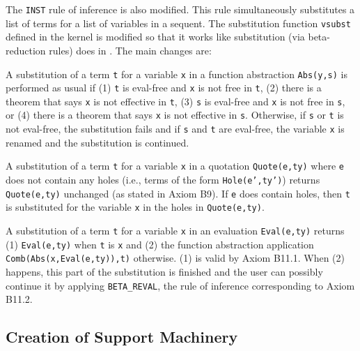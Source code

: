 \documentclass[fleqn]{llncs}
\begin{document}
The \texttt{INST} rule of inference is also modified.  This rule
simultaneously substitutes a list of terms for a list of variables in
a sequent.  The substitution function \texttt{vsubst} defined in the
{\HL} kernel is modified so that it works like substitution (via
beta-reduction  rules) does in {\churchqe}.  The main changes are:

\be

  \item A substitution of a term \texttt{t} for a variable \texttt{x}
    in a function abstraction \texttt{Abs(y,s)} is performed as usual
    if (1) \texttt{t} is eval-free and \texttt{x} is not free in
    \texttt{t}, (2) there is a theorem that says \texttt{x} is not
    effective in \texttt{t}, (3) \texttt{s} is eval-free and
    \texttt{x} is not free in \texttt{s}, or (4) there is a theorem
    that says \texttt{x} is not effective in \texttt{s}.  Otherwise,
    if \texttt{s} or \texttt{t} is not eval-free, the substitution
    fails and if \texttt{s} and \texttt{t} are eval-free, the variable
    \texttt{x} is renamed and the substitution is continued.

  \item A substitution of a term \texttt{t} for a variable \texttt{x}
    in a quotation \texttt{Quote(e,ty)} where \texttt{e} does not
    contain any holes (i.e., terms of the form \texttt{Hole(e',ty')})
    returns \texttt{Quote(e,ty)} unchanged (as stated in Axiom B9).
    If \texttt{e} does contain holes, then \texttt{t} is substituted
    for the variable \texttt{x} in the holes in \texttt{Quote(e,ty)}.

  \item A substitution of a term \texttt{t} for a variable \texttt{x}
    in an evaluation \texttt{Eval(e,ty)} returns (1)
    \texttt{Eval(e,ty)} when \texttt{t} is \texttt{x} and (2) the
    function abstraction application
    \texttt{Comb(Abs(x,Eval(e,ty)),t)} otherwise.  (1) is valid by
    Axiom B11.1.  When (2) happens, this part of the substitution is
    finished and the user can possibly continue it by applying
    \texttt{BETA\_REVAL}, the rule of inference corresponding to Axiom
    B11.2.

\ee

\subsection{Creation of Support Machinery}\label{subsec:machinery}
\end{document}
